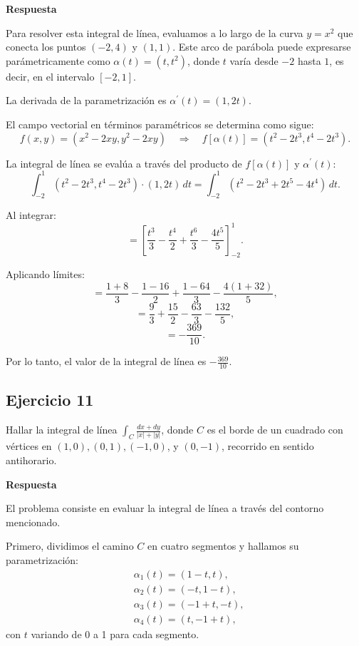 \documentclass{report}
\begin{document}
\textbf{Respuesta}

Para resolver esta integral de línea, evaluamos a lo largo de la curva \(y = x^{2}\) que conecta los puntos \((-2,4)\) y \((1,1)\). Este arco de parábola puede expresarse parámetricamente como \(\alpha(t) = (t, t^{2})\), donde \(t\) varía desde \(-2\) hasta \(1\), es decir, en el intervalo \([-2, 1]\).

La derivada de la parametrización es \(\alpha^{\prime}(t) = (1, 2t)\).

El campo vectorial en términos paramétricos se determina como sigue:
\[
f(x, y) = (x^{2} - 2xy, y^{2} - 2xy) \quad \Rightarrow \quad f[\alpha(t)] = (t^{2} - 2t^{3}, t^{4} - 2t^{3}).
\]

La integral de línea se evalúa a través del producto de \(f[\alpha(t)]\) y \(\alpha^{\prime}(t)\):
\[
\int_{-2}^{1} (t^{2} - 2t^{3}, t^{4} - 2t^{3}) \cdot (1, 2t) \, dt = \int_{-2}^{1} (t^{2} - 2t^{3} + 2t^{5} - 4t^{4}) \, dt.
\]

Al integrar:
\[
= \left[\frac{t^{3}}{3} - \frac{t^{4}}{2} + \frac{t^{6}}{3} - \frac{4t^{5}}{5}\right]_{-2}^{1}.
\]

Aplicando límites:
\[
= \frac{1 + 8}{3} - \frac{1 - 16}{2} + \frac{1 - 64}{3} - \frac{4(1 + 32)}{5},
\]
\[
= \frac{9}{3} + \frac{15}{2} - \frac{63}{3} - \frac{132}{5},
\]
\[
= -\frac{369}{10}.
\]

Por lo tanto, el valor de la integral de línea es \(-\frac{369}{10}\).

\subsection*{Ejercicio 11}
Hallar la integral de línea \(\int_{C} \frac{dx + dy}{|x| + |y|}\), donde \(C\) es el borde de un cuadrado con vértices en \((1,0), (0,1), (-1,0)\), y \((0,-1)\), recorrido en sentido antihorario.

\textbf{Respuesta}

El problema consiste en evaluar la integral de línea a través del contorno mencionado.

Primero, dividimos el camino \(C\) en cuatro segmentos y hallamos su parametrización:
\[
\begin{aligned}
& \alpha_1(t) = (1 - t, t), \\
& \alpha_2(t) = (-t, 1 - t), \\
& \alpha_3(t) = (-1 + t, -t), \\
& \alpha_4(t) = (t, -1 + t),
\end{aligned}
\]
con \(t\) variando de 0 a 1 para cada segmento.
\end{document}

